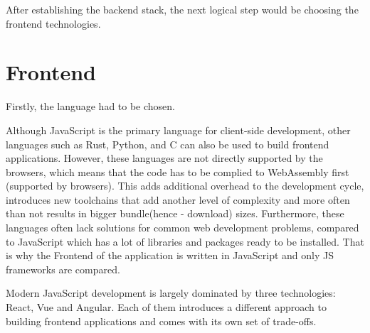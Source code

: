 After establishing the backend stack, the next logical step would be choosing the frontend technologies.


\section{Frontend}
Firstly, the language had to be chosen.

Although JavaScript is the primary language for client-side development,
other languages such as Rust, Python, and C can also be used to build frontend applications.
However, these languages are not directly supported by the browsers, which
means that the code has to be complied to WebAssembly first (supported by browsers). This adds
additional overhead to the development cycle, introduces new toolchains that add another level of
complexity and more often than not results in bigger bundle(hence - download) sizes.
Furthermore, these languages often lack solutions for common web development problems,
compared to JavaScript which has a lot of libraries and packages ready to be installed.
That is why the Frontend of the application is written in JavaScript and only JS frameworks are
compared.

Modern JavaScript development is largely dominated by three technologies: React, Vue and Angular.\cite{frameworkdata}
Each of them introduces a different approach to building frontend applications and comes with its own set of trade-offs.

